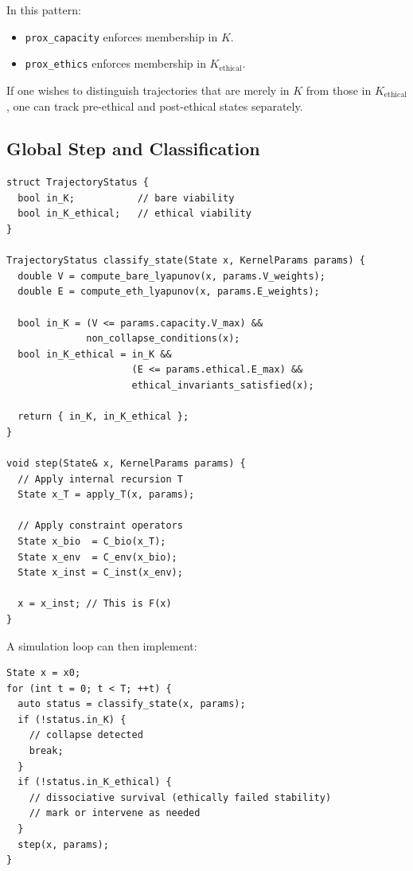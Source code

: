 \documentclass[11pt]{article}
\begin{document}
In this pattern:

\begin{itemize}[leftmargin=*]
  \item \texttt{prox\_capacity} enforces membership in \(K\).
  \item \texttt{prox\_ethics} enforces membership in \(K_{\text{ethical}}\).
\end{itemize}

If one wishes to distinguish trajectories that are merely in \(K\) from those in \(K_{\text{ethical}}\), one can track pre-ethical and post-ethical states separately.

\subsection{Global Step and Classification}

\begin{verbatim}
struct TrajectoryStatus {
  bool in_K;           // bare viability
  bool in_K_ethical;   // ethical viability
}

TrajectoryStatus classify_state(State x, KernelParams params) {
  double V = compute_bare_lyapunov(x, params.V_weights);
  double E = compute_eth_lyapunov(x, params.E_weights);
  
  bool in_K = (V <= params.capacity.V_max) &&
              non_collapse_conditions(x);
  bool in_K_ethical = in_K &&
                      (E <= params.ethical.E_max) &&
                      ethical_invariants_satisfied(x);
  
  return { in_K, in_K_ethical };
}

void step(State& x, KernelParams params) {
  // Apply internal recursion T
  State x_T = apply_T(x, params);
  
  // Apply constraint operators
  State x_bio  = C_bio(x_T);
  State x_env  = C_env(x_bio);
  State x_inst = C_inst(x_env);
  
  x = x_inst; // This is F(x)
}
\end{verbatim}

A simulation loop can then implement:

\begin{verbatim}
State x = x0;
for (int t = 0; t < T; ++t) {
  auto status = classify_state(x, params);
  if (!status.in_K) {
    // collapse detected
    break;
  }
  if (!status.in_K_ethical) {
    // dissociative survival (ethically failed stability)
    // mark or intervene as needed
  }
  step(x, params);
}
\end{verbatim}
\end{document}
